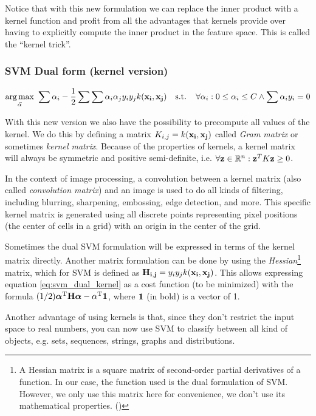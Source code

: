 Notice that with this new formulation we can replace the inner product with a kernel function and profit from all the advantages that kernels provide over having to explicitly compute the inner product in the feature space. This is called the “kernel trick”.

\subsubsection*{SVM Dual form (kernel version)}
\begin{align}\label{eq:svm_dual_kernel} 
    \underset{\vec{\alpha}}{\text{arg} \max}\ \sum \alpha_i - \frac{1}{2} \sum \sum \alpha_i \alpha_j y_i y_j k(\mathbf{x_i}, \mathbf{x_j})
    \text{\ \ \ s.t. \ \ } \forall \alpha_i : 0 \le \alpha_i \le C \land \sum \alpha_i y_i = 0
\end{align}

With this new version we also have the possibility to precompute all values of the kernel. We do this by defining a matrix $K_{i,j} = k(\mathbf{x_i}, \mathbf{x_j})$ called \emph{Gram matrix} or sometimes \emph{kernel matrix}. Because of the properties of kernels, a kernel matrix will always be symmetric and positive semi-definite, i.e. $\forall \mathbf{z} \in \mathbb{R}^n : \mathbf{z}^T K \mathbf{z} \ge 0$.

In the context of image processing, a convolution between a kernel matrix (also called \emph{convolution matrix}) and an image is used to do all kinds of filtering, including blurring, sharpening, embossing, edge detection, and more. This specific kernel matrix is generated using all discrete points representing pixel positions (the center of cells in a grid) with an origin in the center of the grid.

Sometimes the dual SVM formulation will be expressed in terms of the kernel matrix directly. Another matrix formulation can be done by using the \emph{Hessian}\footnote{A Hessian matrix is a square matrix of second-order partial derivatives of a function. In our case, the function used is the dual formulation of SVM. However, we only use this matrix here for convenience, we don't use its mathematical properties. (\cite{sontag_kernel_2013})} matrix, which for SVM is defined as $\mathbf{H_{i,j}} = y_iy_jk(\mathbf{x_i}, \mathbf{x_j})$. This allows expressing equation \ref{eq:svm_dual_kernel} as a cost function (to be minimized) with the formula $(1/2) \boldsymbol{\alpha}^{\text{T}} \mathbf{H} \boldsymbol{\alpha} - \alpha^{\text{T}} \mathbf{1}$, where $\mathbf{1}$ (in bold) is a vector of 1.

Another advantage of using kernels is that, since they don't restrict the input space to real numbers, you can now use SVM to classify between all kind of objects, e.g. sets, sequences, strings, graphs and distributions.

